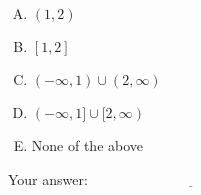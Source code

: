 \documentclass[10pt]{amsart}
\begin{document}
\begin{enumerate}
  \begin{enumerate}[(A)]
  \item $(1,2)$
  \item $[1,2]$
  \item $(-\infty,1) \cup (2,\infty)$
  \item $(-\infty,1] \cup [2,\infty)$
  \item None of the above
  \end{enumerate}

  \vspace{0.1in}
  Your answer: $\underline{\qquad\qquad\qquad\qquad\qquad\qquad\qquad}$
  \vspace{1.5in}

\end{enumerate}
\end{document}
